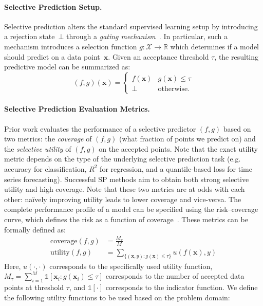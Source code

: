 \paragraph{Selective Prediction Setup.} Selective prediction alters the standard supervised learning setup by introducing a rejection state~$\bot$ through a \textit{gating mechanism}~\citep{yaniv2010riskcoveragecurve}. In particular, such a mechanism introduces a selection function $g:\mathcal{X} \rightarrow \mathbb{R}$ which determines if a model should predict on a data point~$\bm{x}$. 
Given an acceptance threshold $\tau$, the resulting predictive model can be summarized as:
\begin{equation}
    (f,g)(\bm{x}) = \begin{cases}
  f(\bm{x})  & g(\bm{x}) \leq \tau \\
  \bot & \text{otherwise.}
\end{cases}
\end{equation}

\paragraph{Selective Prediction Evaluation Metrics.} Prior work evaluates the performance of a selective predictor $(f,g)$ based on two metrics: the \emph{coverage} of $(f,g)$ (\ie what fraction of points we predict on) and the \emph{selective utility} of $(f,g)$ on the accepted points. Note that the exact utility metric depends on the type of the underlying selective prediction task (e.g. accuracy for classification, $R^2$ for regression, and a quantile-based loss for time series forecasting). Successful SP methods aim to obtain both strong selective utility and high coverage. Note that these two metrics are at odds with each other: na\"ively improving utility leads to lower coverage and vice-versa. The complete performance profile of a model can be specified using the risk–coverage curve, which defines the risk as a function of coverage~\citep{yaniv2010riskcoveragecurve}. These metrics can be formally defined as: 
\begin{align}
    \text{coverage}(f,g) & = \frac{M_\tau}{M} \\
    \text{utility}(f,g) & = \sum_{ \{(\bm{x}, y) : g(\bm{x}) \leq \tau \} } u(f(\bm{x}), y)
\end{align}
Here, $u(\cdot, \cdot)$ corresponds to the specifically used utility function, $M_\tau = \sum_{i=1}^M \mathds{1}[\bm{x}_i : g(\bm{x}_i) \leq \tau]$ corresponds to the number of accepted data points at threshold $\tau$, and $\mathds{1}[\cdot]$ corresponds to the indicator function. We define the following utility functions to be used based on the problem domain:

